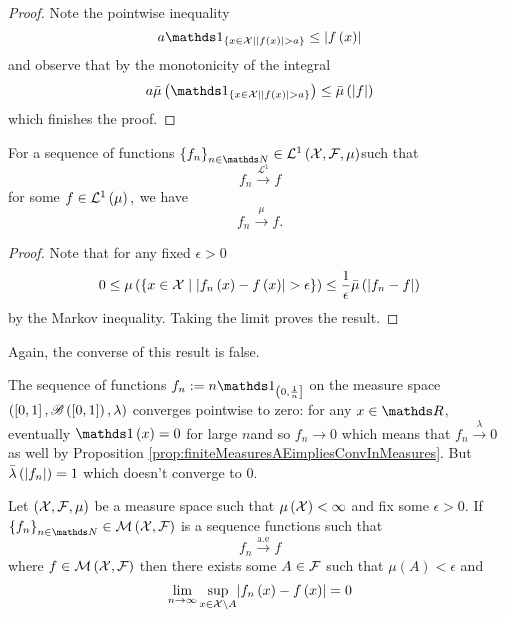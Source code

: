 \begin{proof}
Note the pointwise inequality
\[
a\indicate_{\left\{ x\in\X\mid\lvert f\left(x\right)\rvert>a\right\} }\leq\lvert f\left(x\right)\rvert
\]
and observe that by the monotonicity of the integral
\[
a\lebInt{\mu}{\indicate_{\{x\in\X\mid\lvert f\left(x\right)\rvert>a\}}}\leq\lebInt{\mu}{\lvert f\rvert}
\]
which finishes the proof.
\end{proof}
\begin{prop}
\label{prop:L1impliesConvergenceInMeasure}For a sequence of functions
$\left\{ f_{n}\right\} _{n\in\N}\in\Lp 1{\X,\F,\mu}$such that 
\[
f_{n}\stackrel{\mathcal{L}^{1}}{\longrightarrow}f
\]
for some $f\in\mathcal{L}^{1}\left(\mu\right),$ we have 
\[
f_{n}\stackrel{\mu}{\longrightarrow}f.
\]
\end{prop}

\begin{proof}
Note that for any fixed $\epsilon>0$
\[
0\leq\mu\left(\left\{ x\in\mathcal{X}\mid\lvert f_{n}\left(x\right)-f\left(x\right)\rvert>\epsilon\right\} \right)\leq\frac{1}{\epsilon}\bar{\mu}\left(\lvert f_{n}-f\rvert\right)
\]
by the Markov inequality. Taking the limit proves the result.
\end{proof}
Again, the converse of this result is false.
\begin{example}
\label{exa:convMeasureDoesNotImplyConvLp}The sequence of functions
$f_{n}:=n\indicate_{\left(0,\frac{1}{n}\right]}$ on the measure space
$\left(\left[0,1\right],\mathscr{B}\left(\left[0,1\right]\right),\lambda\right)$
converges pointwise to zero: for any $x\in\R$, eventually $\indicate\left(x\right)=0$
for large $n$and so $f_{n}\to0$ which means that $f_{n}\stackrel{\lambda}{\to}0$
as well by Proposition \ref{prop:finiteMeasuresAEimpliesConvInMeasures}.
But $\bar{\lambda}\left(\lvert f_{n}\rvert\right)=1$ which doesn't converge
to 0.
\end{example}

\begin{thm}
\label{thm:egorovTheorem}Let $\left(\mathcal{X},\mathcal{F},\mu\right)$ be a measure
space such that $\mu\left(\mathcal{X}\right)<\infty$ and fix some $\epsilon>0$.
If $\left\{ f_{n}\right\} _{n\in\N}\in\measurableFunctions$ is a
sequence functions such that
\[
f_{n}\stackrel{\text{a.e}}{\longrightarrow}f
\]
where $f\in\mathcal{M}\left(\mathcal{X},\mathcal{F}\right)$ then there exists some $A\in\mathcal{F}$
such that $\mu\left(A\right)<\epsilon$ and 
\[
\lim_{n\to\infty}\sup_{x\in\mathcal{X}\setminus A}\lvert f_{n}\left(x\right)-f\left(x\right)\rvert=0
\]
\end{thm}

